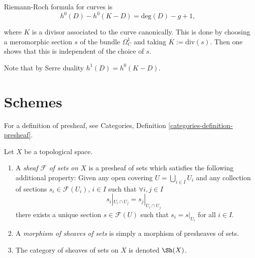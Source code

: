 \documentclass{book}
\begin{document}
Riemann-Roch formula for curves is
\begin{equation}
\label{equation-riemann-roch-curves}
h^0(D)-h^0(K-D)=\text{deg}(D)-g+1,
\end{equation}

\noindent
where $K$ is a divisor associated to the
curve canonically.
This is done by choosing a meromorphic
section $s$
of the bundle $\Omega_C^1$
and taking $K:=\text{div}(s)$.
Then one shows that this is independent of
the choice of $s$.

Note that by Serre duality
$h^1(D)=h^0(K-D)$.


\section{Schemes}
\label{section-shemes}

For a definition of presheaf,
see Categories, Definition
\ref{categories-definition-presheaf}.

\begin{definition}
\label{definition-sheaf}
Let $X$ be a topological space.
\begin{enumerate}
\item A {\it sheaf $\mathcal{F}$ of sets on
$X$} is a presheaf
of sets which satisfies the following
additional property: Given
any open covering $U = \bigcup_{i \in I} U_i$
and any collection
of sections $s_i \in \mathcal{F}(U_i)$, $i
\in I$ such that
$\forall i, j\in I$
$$
s_i|_{U_i \cap U_j} = s_j|_{U_i \cap U_j}
$$
there exists a unique section $s \in
\mathcal{F}(U)$ such that
$s_i = s|_{U_i}$ for all $i \in I$.
\item A {\it morphism of sheaves of sets} is
simply a
morphism of presheaves of sets.
\item The category of sheaves of sets on $X$
is denoted
$\Sh(X)$.
\end{enumerate}
\end{definition}
\end{document}
